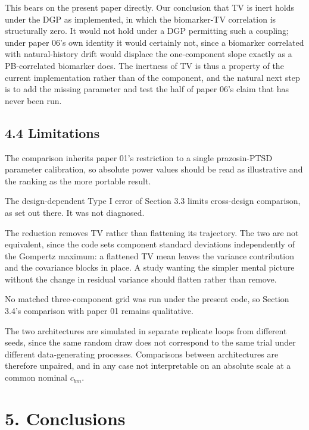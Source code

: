\documentclass[
  11pt,
]{article}
\begin{document}
This bears on the present paper directly. Our conclusion that TV is
inert holds under the DGP as implemented, in which the biomarker-TV
correlation is structurally zero. It would not hold under a DGP
permitting such a coupling; under paper 06's own identity it would
certainly not, since a biomarker correlated with natural-history
drift would displace the one-component slope exactly as a
PB-correlated biomarker does. The inertness of TV is thus a property
of the current implementation rather than of the component, and the
natural next step is to add the missing parameter and test the half
of paper 06's claim that has never been run.

\subsection{4.4 Limitations}

The comparison inherits paper 01's restriction to a single
prazosin-PTSD parameter calibration, so absolute power values should
be read as illustrative and the ranking as the more portable result.

The design-dependent Type I error of Section 3.3 limits cross-design
comparison, as set out there. It was not diagnosed.

The reduction removes TV rather than flattening its trajectory. The
two are not equivalent, since the code sets component standard
deviations independently of the Gompertz maximum: a flattened TV mean
leaves the variance contribution and the covariance blocks in place.
A study wanting the simpler mental picture without the change in
residual variance should flatten rather than remove.

No matched three-component grid was run under the present code, so
Section 3.4's comparison with paper 01 remains qualitative.

The two architectures are simulated in separate replicate loops from
different seeds, since the same random draw does not correspond to
the same trial under different data-generating processes. Comparisons
between architectures are therefore unpaired, and in any case not
interpretable on an absolute scale at a common nominal \(c_{bm}\).

\section{5. Conclusions}
\end{document}
